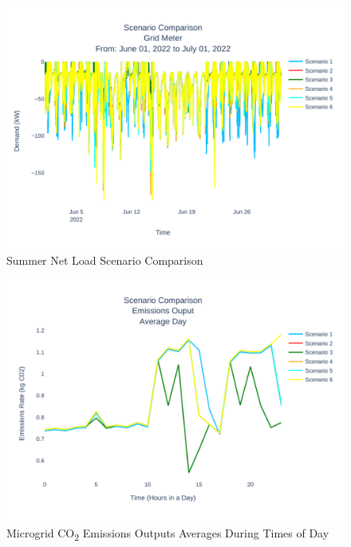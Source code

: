 \documentclass[conference]{IEEEtran}
\begin{document}
	\begin{figure}[H]
		\centering
		\includegraphics[width=1\linewidth]{Fig/net_load_scenario_comparison_summer}
		\caption{Summer Net Load Scenario Comparison}
		\label{fig:netloadscenariocomparisonsummer}
	\end{figure}
	\begin{figure}[H]
		\centering
		\includegraphics[width=1\linewidth]{Fig/emissions_scenario_comparison}
		\caption{Microgrid  CO\textsubscript{2} Emissions Outputs Averages During Times of Day}
		\label{fig:emissionsscenariocomparison}
	\end{figure}
\end{document}
